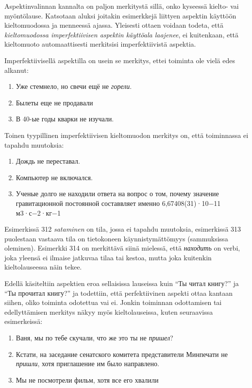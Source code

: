\documentclass[]{scrartcl}
\providecommand{\tightlist}{%
  \setlength{\itemsep}{0pt}\setlength{\parskip}{0pt}}
\begin{document}
Aspektinvalinnan kannalta on paljon merkitystä sillä, onko kyseessä
kielto- vai myöntölause. Katsotaan aluksi joitakin esimerkkejä liittyen
aspektin käyttöön kieltomuodossa ja menneessä ajassa. Yleisesti ottaen
voidaan todeta, että \emph{kieltomuodossa imperfektiivisen aspektin
käyttöala laajenee}, ei kuitenkaan, että kieltomuoto automaattisesti
merkitsisi imperfektiivistä aspektia.

Imperfektiivisellä aspektilla on usein se merkitys, ettei toiminta ole
vielä edes alkanut:

\begin{enumerate}
\def\labelenumi{(\arabic{enumi})}
\setcounter{enumi}{308}
\tightlist
\item
  Уже стемнело, но свечи ещё не \emph{горели}.
\item
  Былеты еще не продавали
\item
  В 40-ые годы кварки не изучали.
\end{enumerate}

Toinen tyypillinen imperfektiivisen kieltomuodon merkitys on, että
toiminnassa ei tapahdu muutoksia:

\begin{enumerate}
\def\labelenumi{(\arabic{enumi})}
\setcounter{enumi}{311}
\tightlist
\item
  Дождь не переставал.
\item
  Компьютер не включался.
\item
  Ученые долго не находили ответа на вопрос о том, почему значение
  гравитационной постоянной составвляет именно 6,67408(31)·10−11
  м3·с−2·кг−1
\end{enumerate}

Esimerkissä 312 \emph{sataminen} on tila, jossa ei tapahdu muutoksia,
esimerkissä 313 puolestaan vastaava tila on tietokoneen
käynnistymättömyys (sammuksissa oleminen). Esimerkki 314 on merkittävä
siinä mielessä, että \emph{находить} on verbi, joka yleensä ei ilmaise
jatkuvaa tilaa tai kestoa, mutta joka kuitenkin kieltolauseessa näin
tekee.

Edellä käsiteltiin aspektien eroa sellaisissa lauseissa kuin ``Ты читал
книгу?'' ja ``Ты прочитал книгу?'' ja todettiin, että perfektiivinen
aspekti ottaa kantaan siihen, oliko toiminta odotettua vai ei. Jonkin
toiminnan odottamisen tai edellyttämisen merkitys näkyy myös
kieltolauseissa, kuten seuraavissa esimerkeissä:

\begin{enumerate}
\def\labelenumi{(\arabic{enumi})}
\setcounter{enumi}{314}
\tightlist
\item
  Ваня, мы по тебе скучали, что же это ты не \emph{пришел}?
\item
  Кстати, на заседание сенатского комитета представители Минпечати не
  \emph{пришли}, хотя приглашение им было направлено.
\item
  Мы не посмотрели фильм, хотя все его хвалили
\end{enumerate}
\end{document}
